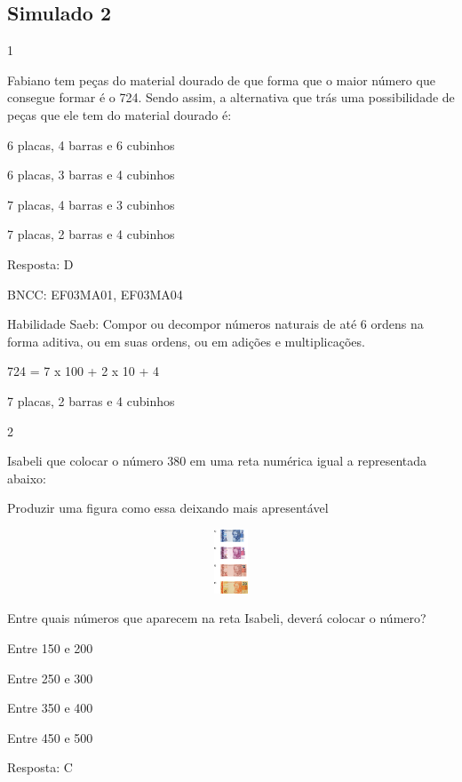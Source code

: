 \begin{escolha}
\begin{escolha}
\chapter{Simulado 2}

\num{1}

Fabiano tem peças do material dourado de que forma que o maior número
que consegue formar é o 724. Sendo assim, a alternativa que trás uma
possibilidade de peças que ele tem do material dourado é:

\begin{escolha}
\item
  6 placas, 4 barras e 6 cubinhos
\item
  6 placas, 3 barras e 4 cubinhos
\item
  7 placas, 4 barras e 3 cubinhos
\item
  7 placas, 2 barras e 4 cubinhos
\end{escolha}

Resposta: D

BNCC: EF03MA01, EF03MA04

Habilidade Saeb: Compor ou decompor números naturais de até 6 ordens na
forma aditiva, ou em suas ordens, ou em adições e multiplicações.

724 = 7 x 100 + 2 x 10 + 4

7 placas, 2 barras e 4 cubinhos

\num{2}

Isabeli que colocar o número 380 em uma reta numérica igual a
representada abaixo:

Produzir uma figura como essa deixando mais apresentável

\includegraphics[width=5.90556in,height=0.74931in]{media/image117.png}

Entre quais números que aparecem na reta Isabeli, deverá colocar o
número?

\begin{escolha}
\item
  Entre 150 e 200
\item
  Entre 250 e 300
\item
  Entre 350 e 400
\item
  Entre 450 e 500
\end{escolha}

Resposta: C


\end{escolha}
\end{escolha}
